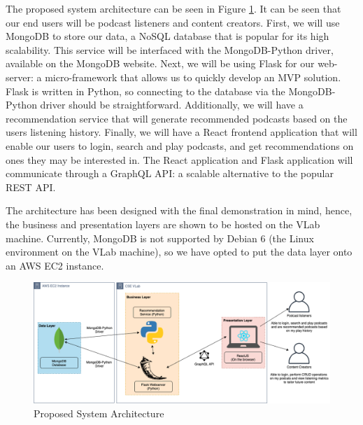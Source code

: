 \documentclass[12pt]{article}
\begin{document}
The proposed system architecture can be seen in Figure \ref{fig:SysArch}.
It can be seen that our end users will be podcast listeners and content creators.
First, we will use MongoDB to store our data, a NoSQL database that is popular for its high scalability.
This service will be interfaced with the MongoDB-Python driver, available on the MongoDB website.
Next, we will be using Flask for our web-server: a micro-framework that allows us to quickly develop an MVP solution.
Flask is written in Python, so connecting to the database via the MongoDB-Python driver should be straightforward.
Additionally, we will have a recommendation service that will generate recommended podcasts based on the users listening history.
Finally, we will have a React frontend application that will enable our users to login, search and play podcasts, and get recommendations on ones they may be interested in.
The React application and Flask application will communicate through a GraphQL API: a scalable alternative to the popular REST API.

The architecture has been designed with the final demonstration in mind, hence, the business and presentation layers are shown to be hosted on the VLab machine.
Currently, MongoDB is not supported by Debian 6 (the Linux environment on the VLab machine), so we have opted to put the data layer onto an AWS EC2 instance.

\begin{figure}[ht]
    \centering
    \includegraphics[width=\textwidth]{resources/SystemArchitecture}
    \caption{Proposed System Architecture}
    \label{fig:SysArch}
\end{figure}

\newpage


\end{document}
